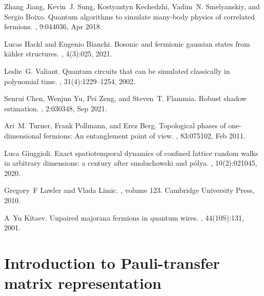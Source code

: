 \documentclass[showpacs,onecolumn,aps,prx,long bibliography,superscriptaddress,notitlepage]{revtex4-1}
\begin{document}
\begin{thebibliography}{10}
Zhang Jiang, Kevin~J. Sung, Kostyantyn Kechedzhi, Vadim~N. Smelyanskiy, and
  Sergio Boixo.
\newblock Quantum algorithms to simulate many-body physics of correlated
  fermions.
, 9:044036, Apr 2018.

Lucas Hackl and Eugenio Bianchi.
\newblock Bosonic and fermionic gaussian states from k{\"a}hler structures.
, 4(3):025, 2021.

Leslie~G. Valiant.
\newblock Quantum circuits that can be simulated classically in polynomial
  time.
, 31(4):1229--1254, 2002.

Senrui Chen, Wenjun Yu, Pei Zeng, and Steven~T. Flammia.
\newblock Robust shadow estimation.
, 2:030348, Sep 2021.

Ari~M. Turner, Frank Pollmann, and Erez Berg.
\newblock Topological phases of one-dimensional fermions: An entanglement point
  of view.
, 83:075102, Feb 2011.

Luca Giuggioli.
\newblock Exact spatiotemporal dynamics of confined lattice random walks in
  arbitrary dimensions: a century after smoluchowski and p{\'o}lya.
, 10(2):021045, 2020.

Gregory~F Lawler and Vlada Limic.
, volume 123.
\newblock Cambridge University Press, 2010.

A~Yu Kitaev.
\newblock Unpaired majorana fermions in quantum wires.
, 44(10S):131, 2001.

\end{thebibliography}







\appendix

\section{Introduction to Pauli-transfer matrix representation}
\label{appendix: intro_superoperator}
\end{document}
